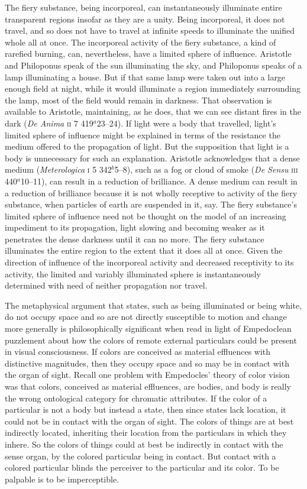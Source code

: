 The fiery substance, being incorporeal, can instantaneously illuminate entire transparent regions insofar as they are a unity. Being incorporeal, it does not travel, and so does not have to travel at infinite speeds to illuminate the unified whole all at once. The incorporeal activity of the fiery substance, a kind of rarefied burning, can, nevertheless, have a limited sphere of influence. Aristotle and Philoponus speak of the sun illuminating the sky, and Philoponus speaks of a lamp illuminating a house. But if that same lamp were taken out into a large enough field at night, while it would illuminate a region immediately surrounding the lamp, most of the field would remain in darkness. That observation is available to Aristotle, maintaining, as he does, that we can see distant fires in the dark (\emph{De Anima} \textsc{ii} 7 419\( ^{a} \)23--24). If light were a body that travelled, light's limited sphere of influence might be explained in terms of the resistance the medium offered to the propagation of light. But the supposition that light is a body is unnecessary for such an explanation. Aristotle acknowledges that a dense medium (\emph{Meterologica} \textsc{i} 5 342\( ^{b} \)5--8), such as a fog or cloud of smoke (\emph{De Sensu} \textsc{iii} 440\( ^{a} \)10--11), can result in a reduction of brilliance. A dense medium can result in a reduction of brilliance because it is not wholly receptive to activity of the fiery substance, when particles of earth are suspended in it, say. The fiery substance's limited sphere of influence need not be thought on the model of an increasing impediment to its propagation, light slowing and becoming weaker as it penetrates the dense darkness until it can no more. The fiery substance illuminates the entire region to the extent that it does all at once. Given the direction of influence of the incorporeal activity and decreased receptivity to its activity, the limited and variably illuminated sphere is instantaneously determined with need of neither propagation nor travel.

The metaphysical argument that states, such as being illuminated or being white, do not occupy space and so are not directly susceptible to motion and change more generally is philosophically significant when read in light of Empedoclean puzzlement about how the colors of remote external particulars could be present in visual consciousness. If colors are conceived as material effluences with distinctive magnitudes, then they occupy space and so may be in contact with the organ of sight. Recall one problem with Empedocles' theory of color vision was that colors, conceived as material effluences, are bodies, and body is really the wrong ontological category for chromatic attributes. If the color of a particular is not a body but instead a state, then since states lack location, it could not be in contact with the organ of sight. The colors of things are at best indirectly located, inheriting their location from the particulars in which they inhere. So the colors of things could at best be indirectly in contact with the sense organ, by the colored particular being in contact. But contact with a colored particular blinds the perceiver to the particular and its color. To be palpable is to be imperceptible.

